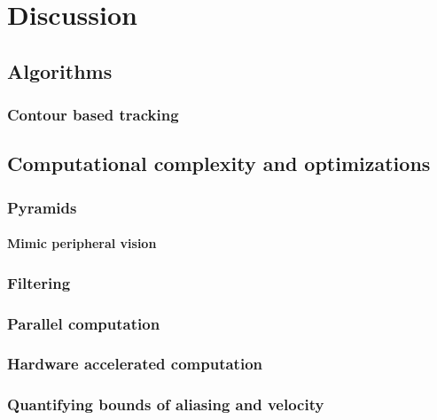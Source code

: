 
\chapter{Discussion}

\section{Algorithms}

\subsection{Contour based tracking}


\section{Computational complexity and optimizations}
\todo{!}

\subsection{Pyramids}
\todo{!}

\subsubsection{Mimic peripheral vision}


\subsection{Filtering}
\todo{!}

\subsection{Parallel computation}

\subsection{Hardware accelerated computation}

\subsection{Quantifying bounds of aliasing and velocity}